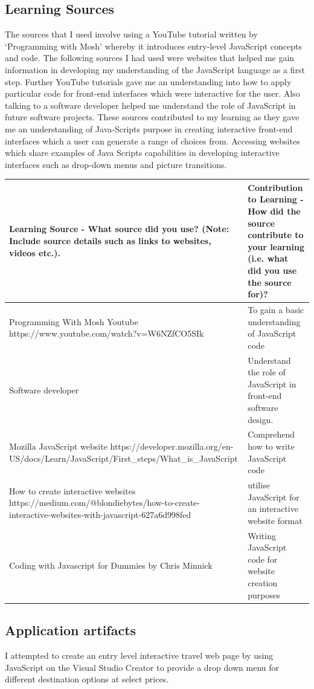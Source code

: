 \documentclass[a4paper, 11pt]{report}
\begin{document}
\subsection{Learning Sources}
The sources that I used involve using a YouTube tutorial written by ‘Programming with Mosh’ whereby it introduces entry-level JavaScript concepts and code. The following sources I had used were websites that helped me gain information in developing my understanding of the JavaScript language as a first step. Further YouTube tutorials gave me an understanding into how to apply particular code for front-end interfaces which were interactive for the user. Also talking to a software developer helped me understand the role of JavaScript in future software projects. 
These sources contributed to my learning as they gave me an understanding of Java-Scripts purpose in creating interactive front-end interfaces which a user can generate a range of choices from. Accessing websites which share examples of Java Scripts capabilities in developing interactive interfaces such as drop-down menus and picture transitions. 

\begin{tabular}{|p{}|p{}|}
	\hline
	Learning Source - What source did you use? (Note: Include source details such as links to websites, videos etc.). & Contribution to Learning - How did the source contribute to your learning (i.e. what did you use the source for)?\\
	\hline
	Programming With Mosh Youtube https://www.youtube.com/watch?v=W6NZfCO5SIk & To gain a basic understanding of JavaScript code\\
	\hline
        Software developer  & Understand the role of JavaScript in front-end software design.  \\
	\hline
	   Mozilla JavaScript website https://developer.mozilla.org/en-US/docs/Learn/JavaScript/First_steps/What_is_JavaScript  & Comprehend how to write JavaScript code\\
	\hline
	    How to create interactive websites https://medium.com/@blondiebytes/how-to-create-interactive-websites-with-javascript-627a6d998fed  & utilise JavaScript for an interactive website format\\ 
	\hline
	    Coding with Javascript for Dummies by Chris Minnick & Writing JavaScript code for website creation purposes\\
	\hline
\end{tabular}

\subsection{Application artifacts}
I attempted to create an entry level interactive travel web page by using JavaScript on the Visual Studio Creator to provide a drop down menu for different destination options at select prices. 
\end{document}
